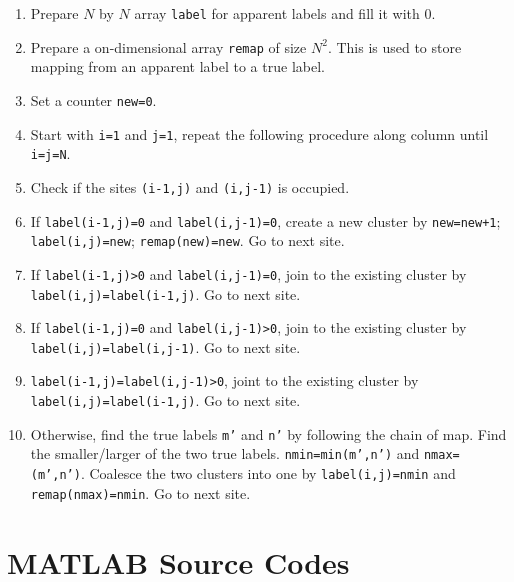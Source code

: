 \bigskip
\begin{myalgobox}
\label{algo:clusters}

\medskip
\begin{minipage}{5.5in}
\small
\begin{enumerate}
\item Prepare $N$ by $N$ array \texttt{label} for apparent labels and fill it with $0$.
\item Prepare a on-dimensional array \texttt{remap} of size $N^2$. This is used to store mapping from an apparent label to a true label.
\item Set a counter \texttt{new=0}.
\item Start with \texttt{i=1} and \texttt{j=1}, repeat the following procedure along column until \texttt{i=j=N}.
\item Check if the sites \texttt{(i-1,j)} and \texttt{(i,j-1)} is occupied.
\item If \texttt{label(i-1,j)=0} and \texttt{label(i,j-1)=0}, create a new cluster by \texttt{new=new+1}; \texttt{label(i,j)=new}; \texttt{remap(new)=new}.  Go to next site.
\item If \texttt{label(i-1,j)>0} and \texttt{label(i,j-1)=0}, join to the existing cluster by \texttt{label(i,j)=label(i-1,j)}.  Go to next site.
\item If \texttt{label(i-1,j)=0} and \texttt{label(i,j-1)>0}, join to the existing cluster by \texttt{label(i,j)=label(i,j-1)}.  Go to next site.
\item \texttt{label(i-1,j)=label(i,j-1)>0}, joint to the existing cluster by \texttt{label(i,j)=label(i-1,j)}.  Go to next site.
\item Otherwise, find the true labels \texttt{m'} and \texttt{n'} by following the chain of map.  Find the smaller/larger  of the  two true labels.  \texttt{nmin=min(m',n')} and \texttt{nmax=(m',n')}. Coalesce the two clusters into one by \texttt{label(i,j)=nmin} and \texttt{remap(nmax)=nmin}.  Go to next site.
\end{enumerate}
\end{minipage}
\end{myalgobox}


\vfill

\newpage
\noindent
\section*{MATLAB Source Codes}

